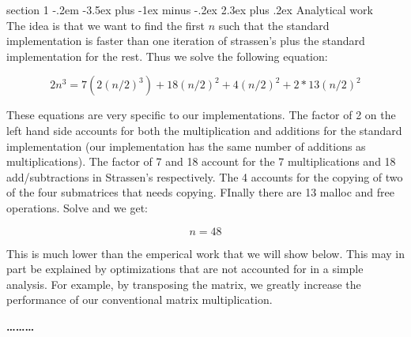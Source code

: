 \documentclass[12pt]{article}
\makeatletter
\newenvironment{problem}{\@startsection
       {section}
       {1}
       {-.2em}
       {-3.5ex plus -1ex minus -.2ex}
       {2.3ex plus .2ex}
       {\pagebreak[3]%
       \large\bf\noindent{Problem }
       }
       }
       {%
       \begin{center}\large\bf \ldots\ldots\ldots\end{center}}
\makeatother
\begin{document}
\begin{problem}{}
Analytical work\\

\noindent The idea is that we want to find the first $n$ such that the
standard implementation is faster than one iteration of strassen's
plus the standard implementation for the rest. Thus we solve the
following equation:

$$2n^3 = 7(2(n/2)^3) +18(n/2)^2 + 4(n/2)^2 + 2*13(n/2)^2$$

\noindent These equations are very specific to our
implementations. The factor of 2 on the left hand side accounts for
both the multiplication and additions for the standard implementation
(our implementation has the same number of additions as
multiplications). The factor of 7 and 18 account for the 7
multiplications and 18 add/subtractions in Strassen's
respectively. The 4 accounts for the copying of two of the four
submatrices that needs copying. FInally there are 13 malloc and free
operations. Solve and we get:

$$n = 48$$

\noindent This is much lower than the emperical work that we will show
below. This may in part be explained by optimizations that are not
accounted for in a simple analysis. For example, by transposing the
matrix, we greatly increase the performance of our conventional matrix
multiplication.


\end{problem}{}
\end{document}
